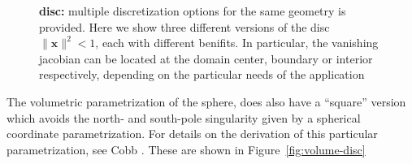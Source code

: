 \documentclass[preprint,12pt, a4paper]{elsarticle}
\begin{document}
\begin{figure}
  \begin{center}
    \hspace{.02\linewidth}
    \hspace{.02\linewidth}
    \caption{\textbf{disc:} multiple discretization options for the same geometry is provided. Here we show three different versions of the disc $\|\mathbf{x}\|^2<1$, each with different benifits. In particular, the vanishing jacobian can be located at the domain center, boundary or interior respectively, depending on the particular needs of the application}
    \label{fig:surface-disc}
  \end{center}
\end{figure}

The volumetric parametrization of the sphere, does also have a ``square'' version which avoids the north- and south-pole singularity given by a spherical coordinate parametrization.
For details on the derivation of this particular parametrization, see Cobb \cite{cobb1988tts}.
These are shown in Figure~\ref{fig:volume-disc}
\end{document}
